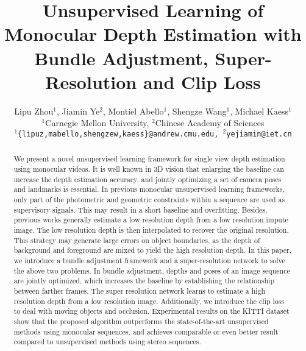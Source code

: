 \documentclass[10pt,twocolumn,letterpaper]{article}
\begin{document}
\title{Unsupervised Learning of Monocular Depth Estimation with Bundle Adjustment, Super-Resolution and Clip Loss}

\author{Lipu Zhou$^1$, Jiamin Ye$^2$, Montiel Abello$^1$, Shengze Wang$^1$, Michael Kaess$^1$\\
$^1$Carnegie Mellon University, $^2$Chinese Academy of Sciences\\
{\tt\small $^1$\{lipuz,mabello,shengzew,kaess\}@andrew.cmu.edu, $^2$yejiamin@iet.cn}
}


\maketitle

\begin{abstract}
We present a novel unsupervised learning framework for single view depth estimation using monocular videos. It is well known in 3D vision that enlarging the baseline can increase the depth estimation accuracy, and jointly optimizing a set of camera poses and landmarks is essential. In previous monocular unsupervised learning frameworks, only part of the photometric and geometric constraints within a sequence are used as supervisory signals. This may result in a short baseline and overfitting.  Besides, previous works generally estimate a low resolution depth from a low resolution impute image. The low resolution depth is then interpolated to recover the original resolution. This strategy may generate large errors on object boundaries, as the depth of background and foreground are mixed to yield the high resolution depth. In this paper, we introduce a bundle adjustment framework and a super-resolution network to solve the above two problems. In bundle adjustment, depths and poses of an image sequence are jointly optimized, which increases the baseline by establishing the relationship between farther frames. The super resolution network learns to estimate a high resolution depth from a low resolution image. Additionally, we introduce the clip loss to deal with moving objects and occlusion.  Experimental results on the KITTI dataset show that the proposed algorithm outperforms the state-of-the-art unsupervised methods using monocular sequences, and achieves comparable or even better result compared to  unsupervised methods using stereo sequences.
\end{abstract}
\end{document}
